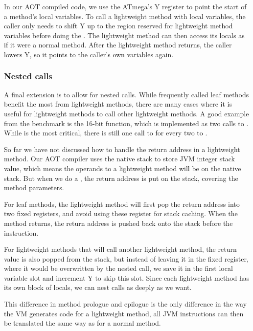 In our AOT compiled code, we use the ATmega's Y register to point the start of a method's local variables. To call a lightweight method with local variables, the caller only needs to shift Y up to the region reserved for lightweight method variables before doing the . The lightweight method can then access its locals as if it were a normal method. After the lightweight method returns, the caller lowers Y, so it points to the caller's own variables again.

\subsubsection{Nested calls}
A final extension is to allow for nested calls. While frequently called leaf methods benefit the most from lightweight methods, there are many cases where it is useful for lightweight methods to call other lightweight methods. A good example from the  benchmark is the 16-bit  function, which is implemented as two calls to . While  is the most critical, there is still one call to  for every two to .

So far we have not discussed how to handle the return address in a lightweight method. Our AOT compiler uses the native stack to store JVM integer stack value, which means the operands to a lightweight method will be on the native stack. But when we do a , the return address is put on the stack, covering the method parameters.

For leaf methods, the lightweight method will first pop the return address into two fixed registers, and avoid using these register for stack caching. When the method returns, the return address is pushed back onto the stack before the  instruction.

For lightweight methods that will call another lightweight method, the return value is also popped from the stack, but instead of leaving it in the fixed register, where it would be overwritten by the nested call, we save it in the first local variable slot and increment Y to skip this slot. Since each lightweight method has its own block of locals, we can nest calls as deeply as we want.

This difference in method prologue and epilogue is the only difference in the way the VM generates code for a lightweight method, all JVM instructions can then be translated the same way as for a normal method.

